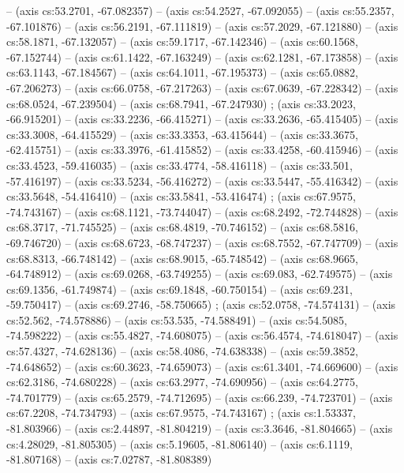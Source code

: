   -- (axis cs:53.2701, -67.082357) -- (axis cs:54.2527, -67.092055) -- (axis
  cs:55.2357, -67.101876) -- (axis cs:56.2191, -67.111819) -- (axis
  cs:57.2029, -67.121880) -- (axis cs:58.1871, -67.132057) -- (axis
  cs:59.1717, -67.142346) -- (axis cs:60.1568, -67.152744) -- (axis
  cs:61.1422, -67.163249) -- (axis cs:62.1281, -67.173858) -- (axis
  cs:63.1143, -67.184567) -- (axis cs:64.1011, -67.195373) -- (axis
  cs:65.0882, -67.206273) -- (axis cs:66.0758, -67.217263) -- (axis
  cs:67.0639, -67.228342) -- (axis cs:68.0524, -67.239504) -- (axis
  cs:68.7941, -67.247930) ;  (axis cs:33.2023,
  -66.915201) -- (axis cs:33.2236, -66.415271) -- (axis cs:33.2636,
  -65.415405) -- (axis cs:33.3008, -64.415529) -- (axis cs:33.3353,
  -63.415644) -- (axis cs:33.3675, -62.415751) -- (axis cs:33.3976,
  -61.415852) -- (axis cs:33.4258, -60.415946) -- (axis cs:33.4523,
  -59.416035) -- (axis cs:33.4774, -58.416118) -- (axis cs:33.501, -57.416197)
  -- (axis cs:33.5234, -56.416272) -- (axis cs:33.5447, -55.416342) -- (axis
  cs:33.5648, -54.416410) -- (axis cs:33.5841, -53.416474)
  ;  (axis cs:67.9575, -74.743167) -- (axis
  cs:68.1121, -73.744047) -- (axis cs:68.2492, -72.744828) -- (axis
  cs:68.3717, -71.745525) -- (axis cs:68.4819, -70.746152) -- (axis
  cs:68.5816, -69.746720) -- (axis cs:68.6723, -68.747237) -- (axis
  cs:68.7552, -67.747709) -- (axis cs:68.8313, -66.748142) -- (axis
  cs:68.9015, -65.748542) -- (axis cs:68.9665, -64.748912) -- (axis
  cs:69.0268, -63.749255) -- (axis cs:69.083, -62.749575) -- (axis cs:69.1356,
  -61.749874) -- (axis cs:69.1848, -60.750154) -- (axis cs:69.231, -59.750417)
  -- (axis cs:69.2746, -58.750665) ;  (axis
  cs:52.0758, -74.574131) -- (axis cs:52.562, -74.578886) -- (axis cs:53.535,
  -74.588491) -- (axis cs:54.5085, -74.598222) -- (axis cs:55.4827,
  -74.608075) -- (axis cs:56.4574, -74.618047) -- (axis cs:57.4327,
  -74.628136) -- (axis cs:58.4086, -74.638338) -- (axis cs:59.3852,
  -74.648652) -- (axis cs:60.3623, -74.659073) -- (axis cs:61.3401,
  -74.669600) -- (axis cs:62.3186, -74.680228) -- (axis cs:63.2977,
  -74.690956) -- (axis cs:64.2775, -74.701779) -- (axis cs:65.2579,
  -74.712695) -- (axis cs:66.239, -74.723701) -- (axis cs:67.2208, -74.734793)
  -- (axis cs:67.9575, -74.743167) ;  (axis
  cs:1.53337, -81.803966) -- (axis cs:2.44897, -81.804219) -- (axis cs:3.3646,
  -81.804665) -- (axis cs:4.28029, -81.805305) -- (axis cs:5.19605,
  -81.806140) -- (axis cs:6.1119, -81.807168) -- (axis cs:7.02787, -81.808389)
